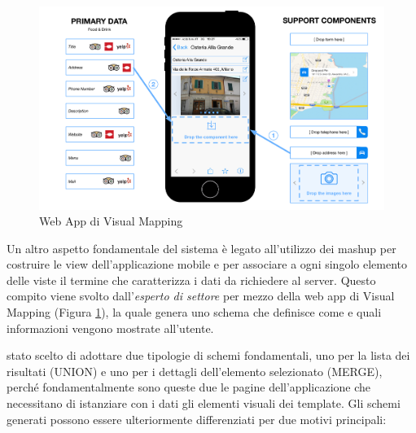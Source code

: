 \begin{figure}[ht]
	\centering
	\includegraphics[width=\textwidth]{4-metodologia/Immagini/visual-mapping-nuovo.png}
	\caption{Web App di Visual Mapping}\label{fig:visual-mapping}
\end{figure}

Un altro aspetto fondamentale del sistema è legato all'utilizzo dei mashup per costruire le view dell'applicazione mobile e per associare a ogni singolo elemento delle viste il termine che caratterizza i dati da richiedere al server. Questo compito viene svolto dall'\emph{esperto di settore} per mezzo della web app di Visual Mapping (Figura \ref{fig:visual-mapping}), la quale genera uno schema che definisce come e quali informazioni vengono mostrate all'utente.

\upe stato scelto di adottare due tipologie di schemi fondamentali, uno per la lista dei risultati (UNION) e uno per i dettagli dell'elemento selezionato (MERGE), perché fondamentalmente sono queste due le pagine dell'applicazione che necessitano di istanziare con i dati gli elementi visuali dei template.
Gli schemi generati possono essere ulteriormente differenziati per due motivi principali:

